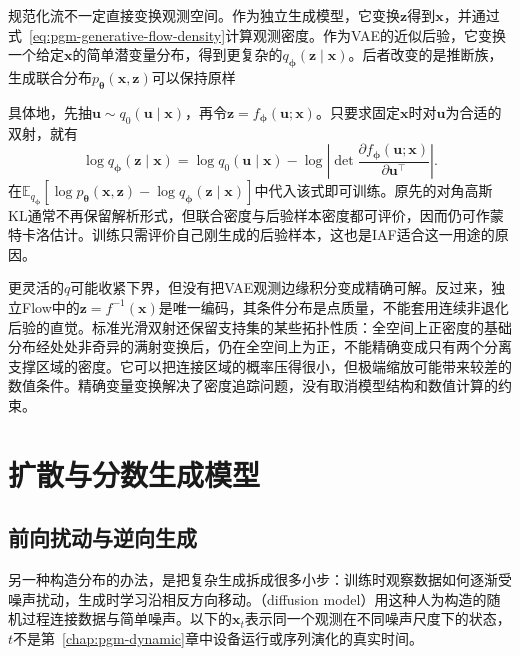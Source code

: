 规范化流不一定直接变换观测空间。作为独立生成模型，它变换$\bm{z}$得到$\bm{x}$，并通过式~\eqref{eq:pgm-generative-flow-density}计算观测密度。作为VAE的近似后验，它变换一个给定$\bm{x}$的简单潜变量分布，得到更复杂的$q_{\bm{\phi}}(\bm{z}\mid\bm{x})$。后者改变的是推断族，生成联合分布$p_{\bm{\theta}}(\bm{x},\bm{z})$可以保持原样

具体地，先抽$\bm{u}\sim q_0(\bm{u}\mid\bm{x})$，再令$\bm{z}=f_{\bm{\phi}}(\bm{u};\bm{x})$。只要求固定$\bm{x}$时对$\bm{u}$为合适的双射，就有
\begin{equation}
  \label{eq:pgm-generative-flow-posterior}
  \log q_{\bm{\phi}}(\bm{z}\mid\bm{x})
  =\log q_0(\bm{u}\mid\bm{x})
    -\log\left|
       \det\frac{\partial f_{\bm{\phi}}(\bm{u};\bm{x})}
                     {\partial\bm{u}^{\top}}
      \right|.
\end{equation}
在$\mathbb{E}_{q_{\bm{\phi}}}[\log p_{\bm{\theta}}(\bm{x},\bm{z})-\log q_{\bm{\phi}}(\bm{z}\mid\bm{x})]$中代入该式即可训练。原先的对角高斯KL通常不再保留解析形式，但联合密度与后验样本密度都可评价，因而仍可作蒙特卡洛估计。训练只需评价自己刚生成的后验样本，这也是IAF适合这一用途的原因。

更灵活的$q$可能收紧下界，但没有把VAE观测边缘积分变成精确可解。反过来，独立Flow中的$\bm{z}=f^{-1}(\bm{x})$是唯一编码，其条件分布是点质量，不能套用连续非退化后验的直觉。标准光滑双射还保留支持集的某些拓扑性质：全空间上正密度的基础分布经处处非奇异的满射变换后，仍在全空间上为正，不能精确变成只有两个分离支撑区域的密度。它可以把连接区域的概率压得很小，但极端缩放可能带来较差的数值条件。精确变量变换解决了密度追踪问题，没有取消模型结构和数值计算的约束。

\section{扩散与分数生成模型}
\label{sec:pgm-generative-diffusion}

\subsection{前向扰动与逆向生成}
\label{sec:pgm-generative-forward-reverse}

另一种构造分布的办法，是把复杂生成拆成很多小步：训练时观察数据如何逐渐受噪声扰动，生成时学习沿相反方向移动。（diffusion model）用这种人为构造的随机过程连接数据与简单噪声。以下的$\bm{x}_t$表示同一个观测在不同噪声尺度下的状态，$t$不是第~\ref{chap:pgm-dynamic}章中设备运行或序列演化的真实时间。

